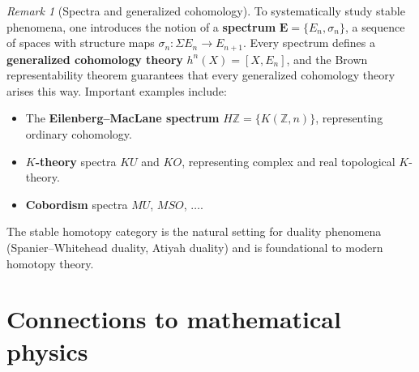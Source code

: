 \documentclass[12pt,a4paper,openany]{book}
\theoremstyle{definition}
\theoremstyle{plain}
\theoremstyle{remark}
\newtheorem{remark}[definition]{Remark}
\newcommand{\Z}{\mathbb{Z}}
\begin{document}
\begin{remark}[Spectra and generalized cohomology]
To systematically study stable phenomena, one introduces the notion
of a \textbf{spectrum} $\mathbf{E}=\{E_n,\sigma_n\}$, a sequence of
spaces with structure maps $\sigma_n\colon\Sigma E_n\to E_{n+1}$.
Every spectrum defines a \textbf{generalized cohomology theory}
$h^n(X)=[X,E_n]$, and the Brown representability theorem guarantees
that every generalized cohomology theory arises this way.  Important
examples include:
\begin{itemize}
  \item The \textbf{Eilenberg--MacLane spectrum}
    $H\Z=\{K(\Z,n)\}$, representing
    ordinary cohomology.
  \item \textbf{$K$-theory} spectra $KU$ and $KO$,
    representing complex and real topological $K$-theory.
  \item \textbf{Cobordism} spectra $MU$, $MSO$,
    $\dots$.
\end{itemize}
The stable homotopy category is the natural setting for duality
phenomena (Spanier--Whitehead duality,
Atiyah duality) and is foundational to modern
homotopy theory.
\end{remark}

\section{Connections to mathematical physics}
\label{sec:physics-connections}
\end{document}
